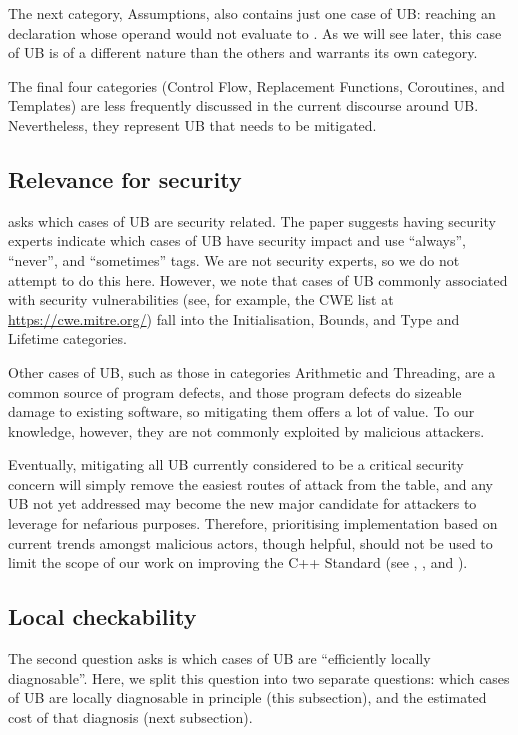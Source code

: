 The next category, Assumptions, also contains just one case of UB: reaching an \tcode{[[assume]]} declaration whose operand would not evaluate to . As we will see later, this case of UB is of a different nature than the others and warrants its own category.

The final four categories (Control Flow, Replacement Functions, Coroutines, and Templates) are less frequently discussed in the current discourse around UB. Nevertheless, they represent UB that needs to be mitigated.

\subsection{Relevance for security}

\cite{P3656R1} asks which cases of UB are security related. The paper suggests having security experts indicate which cases of UB have security impact and use ``always'', ``never'', and ``sometimes'' tags. We are not security experts, so we do not attempt to do this here. However, we note that cases of UB commonly associated with security vulnerabilities (see, for example, the CWE list at \url{https://cwe.mitre.org/}) fall into the Initialisation, Bounds, and Type and Lifetime categories. 

Other cases of UB, such as those in categories Arithmetic and Threading, are a common source of program defects, and those program defects do sizeable damage to existing software, so mitigating them offers a lot of value. To our knowledge, however, they are not commonly exploited by malicious attackers.

Eventually, mitigating all UB currently considered to be a critical security concern will simply remove the easiest routes of attack from the table, and any UB not yet addressed may become the new major candidate for attackers to leverage for nefarious purposes.  Therefore, prioritising implementation based on current trends amongst malicious actors, though helpful, should not be used to limit the scope of our work on improving the C++ Standard (see \cite{Sutter2024}, \cite{P3500R1}, and \cite{P3578R0}).

\subsection{Local checkability}
\label{locally}

The second question \cite{P3656R1} asks is which cases of UB are ``efficiently locally diagnosable''. Here, we split this question into two separate questions: which cases of UB are locally diagnosable in principle (this subsection), and the estimated cost of that diagnosis (next subsection).

